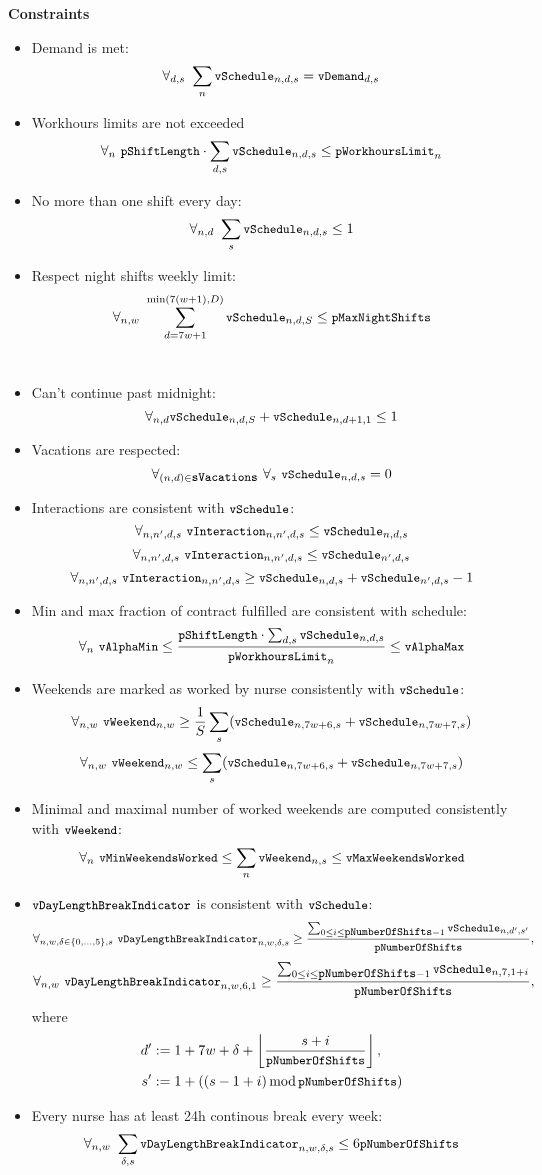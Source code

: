 \noindent\textbf{Constraints}
\begin{itemize}
    \item Demand is met:
    \[ \forall_{d,s}\ \sum_n \texttt{\small vSchedule}_{n,d,s} = \texttt{\small vDemand}_{d, s} \]
    \item Workhours limits are not exceeded
    \[ \forall_{n}\ \texttt{\small pShiftLength}\cdot\sum_{d, s} \texttt{\small vSchedule}_{n,d,s} \leq \texttt{\small pWorkhoursLimit}_n \]
    \item No more than one shift every day:
    \[ \forall_{n,d}\ \sum_s \texttt{\small vSchedule}_{n,d,s} \leq 1 \]
    \item Respect night shifts weekly limit:
    \[ \forall_{n,w}\ \sum_{d=7w+1}^{\min(7(w+1), D)} \texttt{\small vSchedule}_{n,d,S} \leq \texttt{\small pMaxNightShifts} \] \\
    \item Can't continue past midnight:
    \[ \forall_{n,d} \texttt{\small vSchedule}_{n,d,S} + \texttt{\small vSchedule}_{n,d+1,1} \leq 1 \]
    \item Vacations are respected:
    \[ \forall_{(n,d)\in \sVacations}\ \forall_s\ \vSchedule_{n,d,s} = 0 \]
    \item Interactions are consistent with $\texttt{\small vSchedule}$: 
    \[ \forall_{n,n',d,s}\ \texttt{\small vInteraction}_{n,n',d,s} \leq \texttt{\small vSchedule}_{n,d,s} \]
    \[ \forall_{n,n',d,s}\ \texttt{\small vInteraction}_{n,n',d,s} \leq \texttt{\small vSchedule}_{n',d,s} \]
    \[ \forall_{n,n',d,s}\ \texttt{\small vInteraction}_{n,n',d,s} \geq \texttt{\small vSchedule}_{n,d,s} + \texttt{\small vSchedule}_{n',d,s} - 1 \]
    \item Min and max fraction of contract fulfilled are consistent with schedule:
    \[ \forall_{n}\ \texttt{\small vAlphaMin} \leq \frac{\texttt{\small pShiftLength} \cdot \sum_{d,s} \texttt{\small vSchedule}_{n,d,s}}{\texttt{\small pWorkhoursLimit}_n} \leq \texttt{\small vAlphaMax} \]
    \item Weekends are marked as worked by nurse consistently with $\texttt{\small vSchedule}$: 
    \[ \forall_{n, w}\ \texttt{\small vWeekend}_{n, w} \geq \frac{1}{S}\sum_s (\texttt{\small vSchedule}_{n, 7w+6, s} + \texttt{\small vSchedule}_{n, 7w+7, s}) \]
    \[ \forall_{n, w}\ \texttt{\small vWeekend}_{n, w} \leq \sum_s (\texttt{\small vSchedule}_{n, 7w+6, s} + \texttt{\small vSchedule}_{n, 7w+7, s}) \]
    \item Minimal and maximal number of worked weekends are computed consistently with $\texttt{\small vWeekend}$:
    \[ \forall_{n}\ \texttt{\small vMinWeekendsWorked} \le \sum_n \texttt{\small vWeekend}_{n, s} \le \texttt{\small vMaxWeekendsWorked} \]
    \item $\texttt{\small vDayLengthBreakIndicator}$ is consistent with $\texttt{\small vSchedule}$:
    \[ \forall_{n,w,\delta  \in \{0, \dots, 5\},s}\ \vDayLengthBreakIndicator_{n, w, \delta, s} \ge \frac{\sum_{0 \le i \le \pNumberOfShifts - 1} \vSchedule_{n, d', s'}}{\pNumberOfShifts}, \]
    \[ \forall_{n,w}\ \texttt{\small vDayLengthBreakIndicator}_{n, w, 6, 1} \ge \frac{\sum_{0 \le i \le \texttt{\small pNumberOfShifts} - 1} \texttt{\small vSchedule}_{n, 7, 1 + i}}{\texttt{\small pNumberOfShifts}}, \]
    where
    \begin{align*}
        d' &:= 1+7w+\delta+\left\lfloor\frac{s+i}{\texttt{\small pNumberOfShifts}}\right\rfloor, \\
        s' &:= 1 + ((s - 1 + i) \operatorname{mod} \texttt{\small pNumberOfShifts})
    \end{align*}
    \item Every nurse has at least 24h continous break every week:
    \[ \forall_{n, w}\ \sum_{\delta, s} \texttt{\small vDayLengthBreakIndicator}_{n, w, \delta, s} \le 6 \texttt{\small pNumberOfShifts} \]
\end{itemize}

